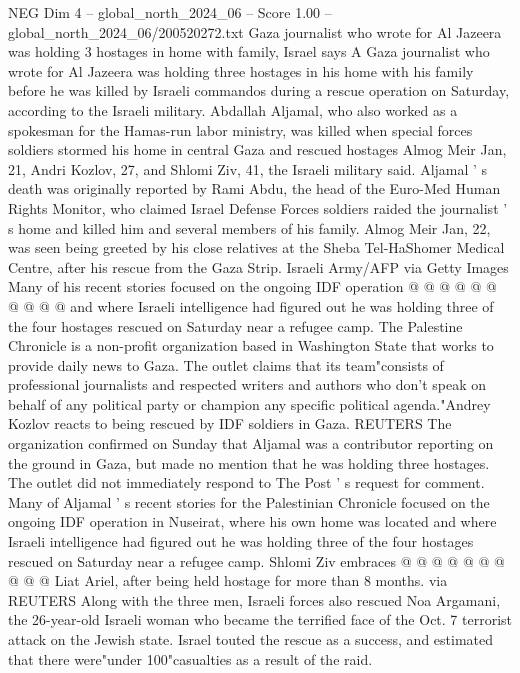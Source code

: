 \begin{textsample}{NEG Dim 4 – global\_north\_2024\_06 – Score 1.00 – global\_north\_2024\_06/200520272.txt}  \label{ex:f4_neg_326}
Gaza journalist who wrote for Al Jazeera was holding 3 hostages in home with family, Israel says A Gaza journalist who wrote for Al Jazeera was holding three hostages in his home with his family before he was killed by Israeli commandos during a rescue operation on Saturday, according to the Israeli military.
Abdallah Aljamal, who also worked as a spokesman for the Hamas-run labor ministry, was killed when special forces soldiers stormed his home in central Gaza and rescued hostages Almog Meir Jan, 21, Andri Kozlov, 27, and Shlomi Ziv, 41, the Israeli military said.
Aljamal ' s death was originally reported by Rami Abdu, the head of the Euro-Med Human Rights Monitor, who claimed Israel Defense Forces soldiers raided the journalist ' s home and killed him and several members of his family.
Almog Meir Jan, 22, was seen being greeted by his close relatives at the Sheba Tel-HaShomer Medical Centre, after his rescue from the Gaza Strip.
Israeli Army/AFP via Getty Images Many of his recent stories focused on the ongoing IDF operation @ @ @ @ @ @ @ @ @ @ and where Israeli intelligence had figured out he was holding three of the four hostages rescued on Saturday near a refugee camp.
The Palestine Chronicle is a non-profit organization based in Washington State that works to provide daily news to Gaza.
The outlet claims that its team"consists of professional journalists and respected writers and authors who don't speak on behalf of any political party or champion any specific political agenda."Andrey Kozlov reacts to being rescued by IDF soldiers in Gaza.
REUTERS The organization confirmed on Sunday that Aljamal was a contributor reporting on the ground in Gaza, but made no mention that he was holding three hostages.
The outlet did not immediately respond to The Post ' s request for comment.
Many of Aljamal ' s recent stories for the Palestinian Chronicle focused on the ongoing IDF operation in Nuseirat, where his own home was located and where Israeli intelligence had figured out he was holding three of the four hostages rescued on Saturday near a refugee camp.
Shlomi Ziv embraces @ @ @ @ @ @ @ @ @ @ Liat Ariel, after being held hostage for more than 8 months. via REUTERS Along with the three men, Israeli forces also rescued Noa Argamani, the 26-year-old Israeli woman who became the terrified face of the Oct. 7 terrorist attack on the Jewish state.
Israel touted the rescue as a success, and estimated that there were"under 100"casualties as a result of the raid.

\end{textsample}
